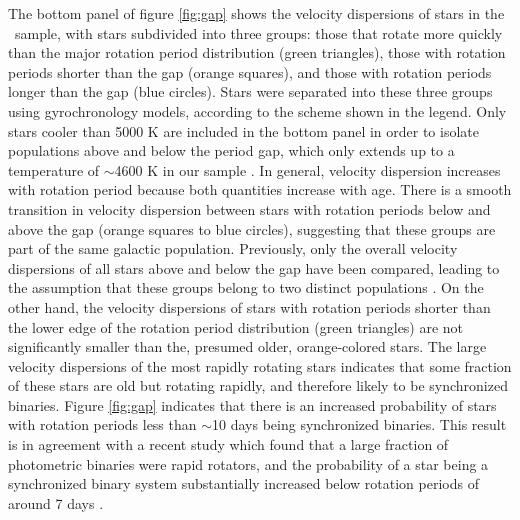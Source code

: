 The bottom panel of figure \ref{fig:gap} shows the velocity dispersions of
stars in the \mct\ sample, with stars subdivided into three groups: those that
rotate more quickly than the major rotation period distribution (green
triangles), those with rotation periods shorter than the gap (orange squares),
and those with rotation periods longer than the gap (blue circles).
Stars were separated into these three groups using \citet{angus2019}
gyrochronology models, according to the scheme shown in the legend.
Only stars cooler than 5000 K are included in the bottom panel in order to
isolate populations above and below the period gap, which only extends up to a
temperature of $\sim$4600 K in our sample \citep[Although][found that the gap
extends to temperatures as hot as 6000 K]{davenport2017}.
In general, velocity dispersion increases with rotation period because both
quantities increase with age.
There is a smooth transition in velocity dispersion between stars with
rotation periods below and above the gap (orange squares to blue circles),
suggesting that these groups are part of the same galactic population.
Previously, only the overall velocity dispersions of all stars above and below
the gap have been compared, leading to the assumption that these groups belong
to two distinct populations \citep{mcquillan2014}.
On the other hand, the velocity dispersions of stars with rotation periods
shorter than the lower edge of the rotation period distribution (green
triangles) are not significantly smaller than the, presumed older,
orange-colored stars.
The large velocity dispersions of the most rapidly rotating stars indicates
that some fraction of these stars are old but rotating rapidly, and therefore
likely to be synchronized binaries.
Figure \ref{fig:gap} indicates that there is an increased probability of stars
with rotation periods less than $\sim$10 days being synchronized binaries.
This result is in agreement with a recent study which found that a large
fraction of photometric binaries were rapid rotators, and the probability of a
star being a synchronized binary system substantially increased below rotation
periods of around 7 days \citep{simonian2019}.


